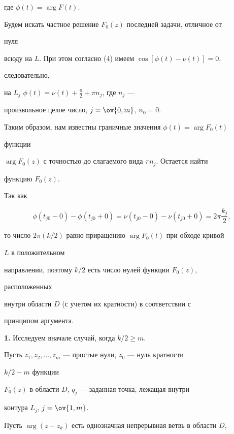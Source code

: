 где $\phi(t)=\arg F(t)$. 


 


Будем искать частное решение $F_0(z)$ последней задачи, отличное от 


нуля 


всюду на $L$. При этом согласно (4) имеем $\cos[\phi(t)-\nu(t)]=0$, 


следовательно,


на $L_j$\; $\phi(t)=\nu(t)+\frac{\pi}{2}+\pi n_j$, где $n_j$ --- 


произвольное целое число, $j=\ov{0,m}$, $n_0=0$. 


Таким образом, нам известны граничные значения $\phi(t)=\arg F_0(t)$ 


функции 


$\arg F_0(z)$ с точностью до слагаемого вида $\pi n_j$. Остается найти 


функцию $F_0(z)$. 


 


Так как 


$$ 


\phi(t_{j0}-0)-\phi(t_{j0}+0)= 


\nu(t_{j0}-0)-\nu(t_{j0}+0)=2\pi\frac{k_j}{2}, 


$$ 


то число $2\pi(k/2)$ равно приращению $\arg F_0(t)$ при обходе кривой 


$L$ в положительном 


направлении, поэтому $k/2$ есть число нулей функции $F_0(z)$, 


расположенных 


внутри области $D$ (с учетом их кратности) в соответствии с 


принципом аргумента. 


\medskip 


 


{\bf 1.} Исследуем вначале случай, когда $k/2 


\ge m$. 


Пусть $z_1,z_2,\dotsc,z_m$ --- простые нули, $z_0$ --- нуль кратности 


$k/2-m$ функции 


$F_0(z)$ в области $D$, $q_j$ --- заданная точка, лежащая внутри 


контура $L_j$, $j=\ov{1,m}$. 


Пусть $\arg(z-z_k)$ есть однозначная непрерывная ветвь в области $D$, 


